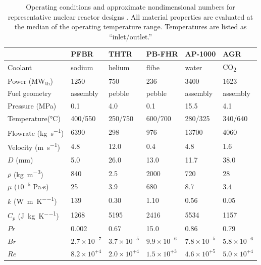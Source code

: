 \begin{table}[!h]
\caption{Operating conditions and approximate nondimensional numbers for representative nuclear reactor designs \cite{pfbr,pfbrTH,thtr_1990,pbfhr,ap1000,ap1000_2,nonbol}. All material properties are evaluated at the median of the operating temperature range. Temperatures are listed as ``inlet/outlet.''}
\centering
\begin{tabular}{|l |l l l l l|}
\hline\hline
 								& PFBR		& THTR 			& PB-FHR 				& AP-1000 			& AGR\Tstrut\Bstrut \\
\hline
 Coolant							& sodium			& helium				& \gls{flibe}				& water				& CO\textsubscript{2}\Tstrut\\
 Power (MW$_\text{th}$)				& 1250			& 750				& 236				& 3400				& 1623\\
 Fuel	 geometry							& assembly		& pebble				& pebble				& assembly			& assembly\Bstrut\\
 \hline
Pressure (\si{\mega\pascal})						& 0.1				& 4.0					& 0.1					& 15.5				& 4.1\Tstrut\\
Temperature(\si{\celsius})				& 400/550		& 250/750				& 600/700				& 280/325				& 340/640\\
Flowrate (\si{\kilo\gram\per\second})						& 6390			& 298				& 976				& 13700				& 4060\\
Velocity (\si{\meter\per\second})						& 4.8				& 12.0				& 0.4					& 4.8				& 1.6\Bstrut\\
 \hline
 \(D\) (mm)						& 5.0				& 26.0				& 13.0				& 11.7			& 38.0\Tstrut\\
 \(\rho\) (\si{\kilo\gram\per\cubic\meter})			& 840			& 2.5					& 2000				& 720			& 28\\
 \(\mu\) (\(10^{-5}\) Pa\(\cdot\)s)			& 25				& 3.9					& 680				& 8.7				& 3.4\\
 \(k\) (\si{\watt\per\meter\per\kelvin})					& 139			& 0.30				& 1.10				& 0.56			& 0.05\\
 \(C_p\) (\si{\joule\per\kilo\gram\per\kelvin})				& 1268			& 5195				& 2416				& 5534			& 1157\Bstrut\\
  \hline
 \(Pr\)							& 0.002			& 0.67				& 15.0				& 0.86			& 0.79\Tstrut\\
 \(Br\)							& \(2.7\times10^{-7}\)& \(3.7\times10^{-5}\)	& \(9.9\times10^{-6}\)	& \(7.8\times10^{-5}\)	& \(5.8\times10^{-6}\)\\
 \(Re\)							& \(8.2\times10^{+4}\)	& \(2.0\times10^{+4}\)		& \(1.5\times10^{+3}\)		& \(4.6\times10^{+5}\)		& \(5.0\times10^{+4}\)\\

\end{tabular}
\end{table}

